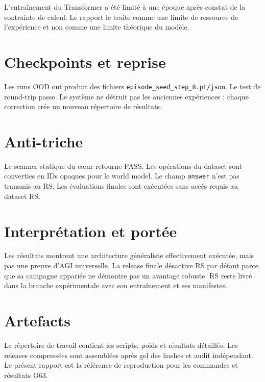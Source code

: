 \documentclass[11pt,a4paper]{article}
\newcommand{\code}[1]{\texttt{#1}}
\begin{document}
L’entraînement du Transformer a été limité à une époque après constat de la contrainte de calcul. Le rapport le traite comme une limite de ressource de l’expérience et non comme une limite théorique du modèle.

\section{Checkpoints et reprise}
Les runs OOD ont produit des fichiers \code{episode\_seed\_step\_8.pt/json}. Le test de round-trip passe. Le système ne détruit pas les anciennes expériences : chaque correction crée un nouveau répertoire de résultats.

\section{Anti-triche}
Le scanner statique du cœur retourne PASS. Les opérations du dataset sont converties en IDs opaques pour le world model. Le champ \code{answer} n’est pas transmis au RS. Les évaluations finales sont exécutées sans accès requis au dataset RS.

\section{Interprétation et portée}
Les résultats montrent une architecture généraliste effectivement exécutée, mais pas une preuve d’AGI universelle. La release finale désactive RS par défaut parce que sa campagne appariée ne démontre pas un avantage robuste. RS reste livré dans la branche expérimentale avec son entraînement et ses manifestes.

\section{Artefacts}
Le répertoire de travail contient les scripts, poids et résultats détaillés. Les releases compressées sont assemblées après gel des hashes et audit indépendant. Le présent rapport est la référence de reproduction pour les commandes et résultats O63.
\end{document}
